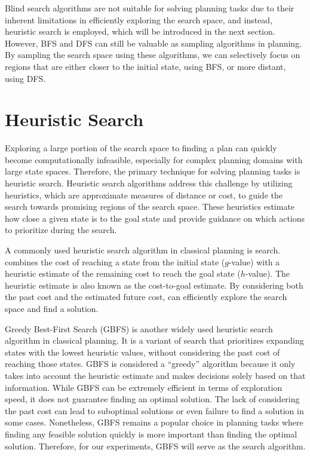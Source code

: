 Blind search algorithms are not suitable for solving planning tasks due to their inherent limitations in efficiently exploring the search space, and instead, heuristic search is employed, which will be introduced in the next section. However, BFS and DFS can still be valuable as sampling algorithms in planning. By sampling the search space using these algorithms, we can selectively focus on regions that are either closer to the initial state, using BFS, or more distant, using DFS.

\section{Heuristic Search}
\label{sec:background_heuristicsearch}

Exploring a large portion of the search space to finding a plan can quickly become computationally infeasible, especially for complex planning domains with large state spaces. Therefore, the primary technique for solving planning tasks is heuristic search. Heuristic search algorithms address this challenge by utilizing heuristics, which are approximate measures of distance or cost, to guide the search towards promising regions of the search space. These heuristics estimate how close a given state is to the goal state and provide guidance on which actions to prioritize during the search.

A commonly used heuristic search algorithm in classical planning is \astar search. \astar combines the cost of reaching a state from the initial state ($g$-value) with a heuristic estimate of the remaining cost to reach the goal state ($h$-value). The heuristic estimate is also known as the cost-to-goal estimate. By considering both the past cost and the estimated future cost, \astar can efficiently explore the search space and find a solution.

Greedy Best-First Search (GBFS) is another widely used heuristic search algorithm in classical planning. It is a variant of \astar search that prioritizes expanding states with the lowest heuristic values, without considering the past cost of reaching those states. GBFS is considered a ``greedy'' algorithm because it only takes into account the heuristic estimate and makes decisions solely based on that information. While GBFS can be extremely efficient in terms of exploration speed, it does not guarantee finding an optimal solution. The lack of considering the past cost can lead to suboptimal solutions or even failure to find a solution in some cases. Nonetheless, GBFS remains a popular choice in planning tasks where finding any feasible solution quickly is more important than finding the optimal solution. Therefore, for our experiments, GBFS will serve as the search algorithm.

